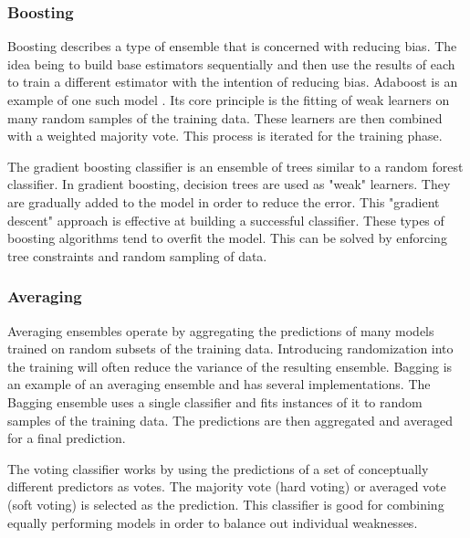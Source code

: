 \subsubsection{Boosting}
Boosting describes a type of ensemble that is concerned with reducing bias.
The idea being to build base estimators sequentially and then use the results of each to train a different estimator with the intention of reducing bias.
Adaboost is an example of one such model \cite{freund1995desicion}.
Its core principle is the fitting of weak learners on many random samples of the training data.
These learners are then combined with a weighted majority vote. 
This process is iterated for the training phase.



\par
The gradient boosting classifier is an ensemble of trees similar to a random forest classifier.
In gradient boosting, decision trees are used as "weak" learners.
They are gradually added to the model in order to reduce the error.
This "gradient descent" approach is effective at building a successful classifier.
These types of boosting algorithms tend to overfit the model.
This can be solved by enforcing tree constraints and random sampling of data.


\subsubsection{Averaging}
Averaging ensembles operate by aggregating the predictions of many models trained on random subsets of the training data.
Introducing randomization into the training will often reduce the variance of the resulting ensemble.
Bagging is an example of an averaging ensemble and has several implementations.
The Bagging ensemble uses a single classifier and fits instances of it to random samples of the training data.
The predictions are then aggregated and averaged for a final prediction.

The voting classifier works by using the predictions of a set of conceptually different predictors as votes.
The majority vote (hard voting) or averaged vote (soft voting) is selected as the prediction.
This classifier is good for combining equally performing models in order to balance out individual weaknesses.

